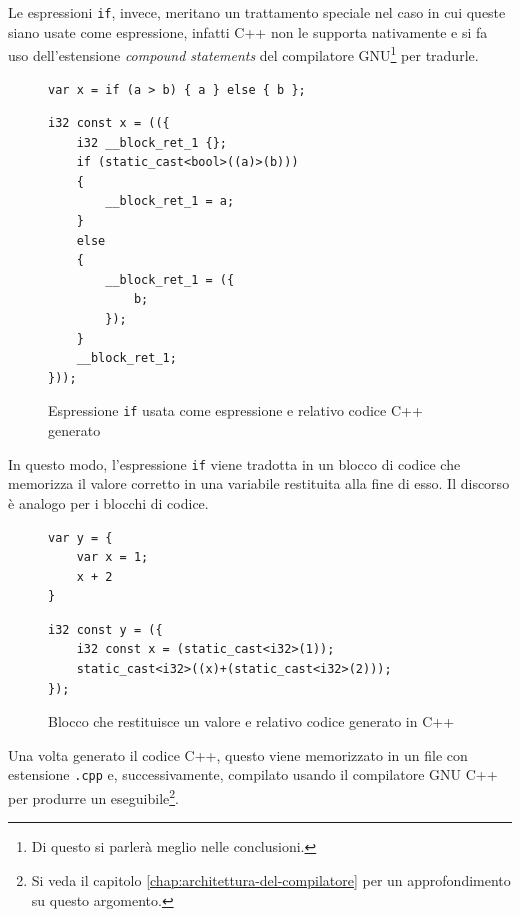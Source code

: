 Le espressioni \texttt{if}, invece, meritano un trattamento speciale nel caso in cui queste siano usate come espressione, infatti C++ non le supporta nativamente e si fa uso dell'estensione \emph{compound statements} del compilatore GNU\footnote{Di questo si parler\`a meglio nelle conclusioni.} per tradurle.
\begin{figure}[H]
	\centering
	\begin{verbatim}
var x = if (a > b) { a } else { b };
	\end{verbatim}
	\begin{verbatim}
i32 const x = (({
    i32 __block_ret_1 {};
    if (static_cast<bool>((a)>(b)))
    {
        __block_ret_1 = a;
    }
    else
    {
        __block_ret_1 = ({
            b;
        });
    }
    __block_ret_1;
}));
	\end{verbatim}
	\label{fig:bugginout-if-expression-transpiled}
	\caption{Espressione \texttt{if} usata come espressione e relativo codice C++ generato}
\end{figure}
In questo modo, l'espressione \texttt{if} viene tradotta in un blocco di codice che memorizza il valore corretto in una variabile restituita alla fine di esso. Il discorso \`e analogo per i blocchi di codice.
\begin{figure}[H]
	\begin{verbatim}
var y = {
    var x = 1;
    x + 2
}
	\end{verbatim}
	\begin{verbatim}
i32 const y = ({
    i32 const x = (static_cast<i32>(1));
    static_cast<i32>((x)+(static_cast<i32>(2)));
});
	\end{verbatim}
	\label{fig:bugginout-block-expression-transpiled}
	\caption{Blocco che restituisce un valore e relativo codice generato in C++}
\end{figure}

Una volta generato il codice C++, questo viene memorizzato in un file con estensione \texttt{.cpp} e, successivamente, compilato usando il compilatore GNU C++ per produrre un eseguibile\footnote{Si veda il capitolo \ref{chap:architettura-del-compilatore} per un approfondimento su questo argomento.}.
